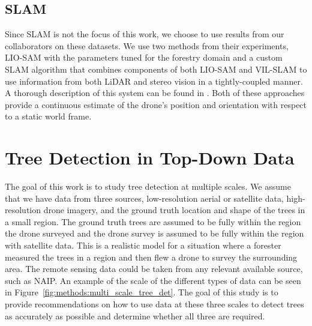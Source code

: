 \subsection{SLAM}    
Since SLAM is not the focus of this work, we choose to use results from our collaborators on these datasets. We use two methods from their experiments, LIO-SAM \cite{Shan2020LIO-SAM:Mapping} with the parameters tuned for the forestry domain and a custom SLAM algorithm that combines components of both LIO-SAM and VIL-SLAM \cite{Shao2019StereoMapping} to use information from both LiDAR and stereo vision in a tightly-coupled manner. A thorough description of this system can be found in \cite{RussellUnmannedMitigation}. Both of these approaches provide a continuous estimate of the drone's position and orientation with respect to a static world frame.

\section{Tree Detection in Top-Down Data}
The goal of this work is to study tree detection at multiple scales. We assume that we have data from three sources, low-resolution aerial or satellite data, high-resolution drone imagery, and the ground truth location and shape of the trees in a small region. The ground truth trees are assumed to be fully within the region the drone surveyed and the drone survey is assumed to be fully within the region with satellite data. This is a realistic model for a situation where a forester measured the trees in a region and then flew a drone to survey the surrounding area. The remote sensing data could be taken from any relevant available source, such as NAIP. An example of the scale of the different types of data can be seen in Figure~\ref{fig:methods:multi_scale_tree_det}. The goal of this study is to provide recommendations on how to use data at these three scales to detect trees as accurately as possible and determine whether all three are required. 

